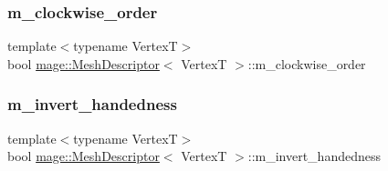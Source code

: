 \subsubsection{\texorpdfstring{m\+\_\+clockwise\+\_\+order}{m\_clockwise\_order}}
{\footnotesize\ttfamily template$<$typename VertexT$>$ \\
bool \hyperlink{structmage_1_1_mesh_descriptor}{mage\+::\+Mesh\+Descriptor}$<$ VertexT $>$\+::m\+\_\+clockwise\+\_\+order\hspace{0.3cm}{\ttfamily [private]}}

\hypertarget{structmage_1_1_mesh_descriptor_af7b8124e44ac65ca2088d5d8ca0639f5}{}\label{structmage_1_1_mesh_descriptor_af7b8124e44ac65ca2088d5d8ca0639f5} 
\subsubsection{\texorpdfstring{m\+\_\+invert\+\_\+handedness}{m\_invert\_handedness}}
{\footnotesize\ttfamily template$<$typename VertexT$>$ \\
bool \hyperlink{structmage_1_1_mesh_descriptor}{mage\+::\+Mesh\+Descriptor}$<$ VertexT $>$\+::m\+\_\+invert\+\_\+handedness\hspace{0.3cm}{\ttfamily [private]}}

